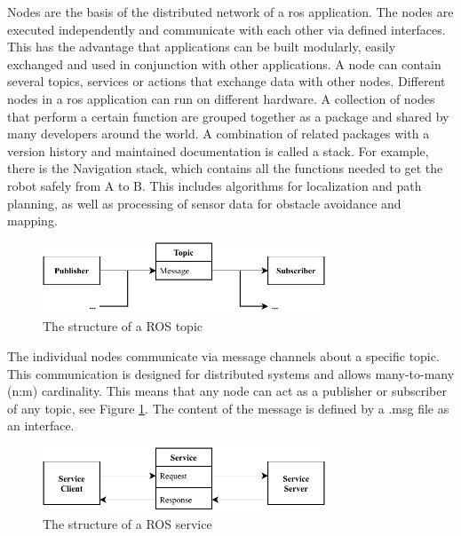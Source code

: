 Nodes are the basis of the distributed network of a \gls{ros} application. The nodes are executed independently and communicate with each other via defined interfaces. This has the advantage that applications can be built modularly, easily exchanged and used in conjunction with other applications. A node can contain several topics, services or actions that exchange data with other nodes. Different nodes in a \gls{ros} application can run on different hardware. A collection of nodes that perform a certain function are grouped together as a package and shared by many developers around the world. A combination of related packages with a version history and maintained documentation is called a stack. For example, there is the Navigation stack, which contains all the functions needed to get the robot safely from A to B. This includes algorithms for localization and path planning, as well as processing of sensor data for obstacle avoidance and mapping.
\begin{figure}[h]
    \centering
    \captionsetup{justification=centering}
    \includegraphics[width=0.75\textwidth]{figures/20_state_of_the_art/topics.pdf}
    \caption{The structure of a ROS topic}
    \label{fig:topics}
\end{figure}
The individual nodes communicate via message channels about a specific topic. This communication is designed for distributed systems and allows many-to-many (n:m) cardinality. This means that any node can act as a publisher or subscriber of any topic, see Figure \ref{fig:topics}. The content of the message is defined by a .msg file as an interface.
\begin{figure}[h]
    \centering
    \captionsetup{justification=centering}
    \includegraphics[width=0.75\textwidth]{figures/20_state_of_the_art/services.pdf}
    \caption{The structure of a ROS service}
    \label{fig:services}
\end{figure}
